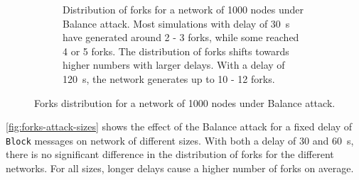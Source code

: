 \begin{figure}[ht]
\begin{subfigure}{\textwidth}
		\vspace*{0.25cm}
		\caption{
			Distribution of forks for a network of \num{1000} nodes under Balance attack.
			Most simulations with delay of \SI{30}{\second} have generated around \num{2} - \num{3} forks, while some reached \num{4} or \num{5} forks.
			The distribution of forks shifts towards higher numbers with larger delays.
			With a delay of \SI{120}{\second}, the network generates up to \num{10} - \num{12} forks.
		}
		\vspace*{0.25cm}
	\end{subfigure}
	\caption[Forks distribution for a network of 1000 nodes under Balance attack]{
		Forks distribution for a network of \num{1000} nodes under Balance attack.
	}
	\label{fig:forks-attack-delay-1000}
\end{figure}

\medskip
\cref{fig:forks-attack-sizes} shows the effect of the Balance attack for a fixed delay of \texttt{Block} messages on network of different sizes.
With both a delay of \num{30} and \SI{60}{\second}, there is no significant difference in the distribution of forks for the different networks.
For all sizes, longer delays cause a higher number of forks on average.

